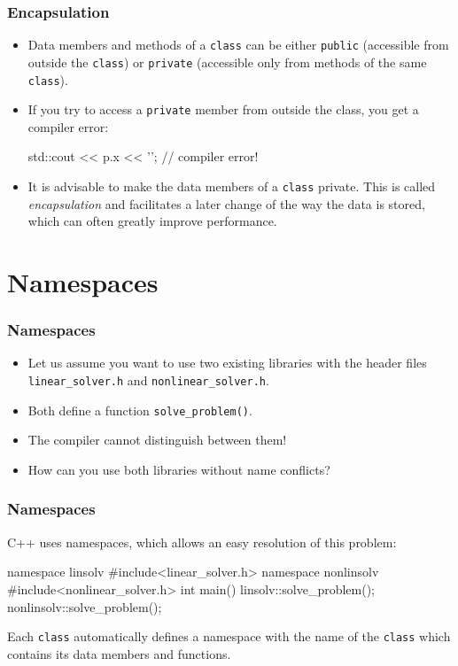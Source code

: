 \documentclass[aspectratio=169,ignorenonframetext,11pt]{beamer}
\def\inline{\lstinline[basicstyle=\small\ttfamily]}
\begin{document}
\begin{frame}[fragile]
  \frametitle{Encapsulation}
  \begin{itemize}
  \item Data members and methods of a \inline!class! can be either \inline!public! (accessible from outside the \inline!class!) or \inline!private! (accessible only from methods of the same \inline!class!).
  \item If you try to access a \inline!private! member from outside the class, you get a compiler error:
    \begin{cppcode}
      std::cout << p.x << '\n'; // compiler error!
    \end{cppcode}
  \item It is advisable to make the data members of a \inline!class! private. This is called \emph{encapsulation} and facilitates a later change of the way the data is stored, which can often greatly improve performance. 
  \end{itemize}
\end{frame}

\section{Namespaces}

\begin{frame}[fragile]
  \frametitle<presentation>{Namespaces}
  \begin{itemize}
  \item Let us assume you want to use two existing libraries with the header files \inline!linear_solver.h! and \inline!nonlinear_solver.h!. 
  \item Both define a function \inline!solve_problem()!. 
  \item The compiler cannot distinguish between them!
  \item How can you use both libraries without name conflicts? 
  \end{itemize}
  
\end{frame}

\begin{frame}[fragile]
  \frametitle<presentation> {Namespaces}
  C++ uses namespaces, which allows an easy resolution of this problem:
\begin{cppcode}
namespace linsolv {
  #include<linear_solver.h>
}
namespace nonlinsolv {
  #include<nonlinear_solver.h>
}
int main() {
  linsolv::solve_problem();
  nonlinsolv::solve_problem();
}
\end{cppcode}
Each \inline!class! automatically defines a namespace with the name of the \inline!class! which contains its data members and functions.
\end{frame}
\end{document}
